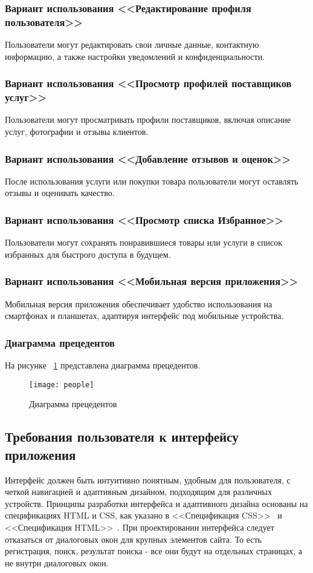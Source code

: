 \subsubsection{Вариант использования <<Редактирование профиля пользователя>>}
Пользователи могут редактировать свои личные данные, контактную информацию, а также настройки уведомлений и конфиденциальности.

\subsubsection{Вариант использования <<Просмотр профилей поставщиков услуг>>}
Пользователи могут просматривать профили поставщиков, включая описание услуг, фотографии и отзывы клиентов.

\subsubsection{Вариант использования <<Добавление отзывов и оценок>>}
После использования услуги или покупки товара пользователи могут оставлять отзывы и оценивать качество.

\subsubsection{Вариант использования <<Просмотр списка Избранное>>}
Пользователи могут сохранять понравившиеся товары или услуги в список избранных для быстрого доступа в будущем.

\subsubsection{Вариант использования <<Мобильная версия приложения>>}
Мобильная версия приложения обеспечивает удобство использования на смартфонах и планшетах, адаптируя интерфейс под мобильные устройства.

\subsubsection{Диаграмма прецедентов}
На рисунке ~\ref{people:image} представлена диаграмма прецедентов.

\begin{figure}[ht]
\texttt{[image: people]}
\caption{Диаграмма прецедентов}
\label{people:image}
\end{figure}

\subsection{Требования пользователя к интерфейсу приложения}
Интерфейс должен быть интуитивно понятным, удобным для пользователя, с четкой навигацией и адаптивным дизайном, подходящим для различных устройств. Принципы разработки интерфейса и адаптивного дизайна основаны на спецификациях HTML и CSS, как указано в <<Спецификация CSS>>~\cite{cssspecs} и <<Спецификация HTML>>~\cite{htmlbook}.
При проектировании интерфейса следует отказаться от диалоговых окон для крупных элементов сайта. То есть регистрация, поиск, результат поиска - все они будут на отдельных страницах, а не внутри диалоговых окон.

